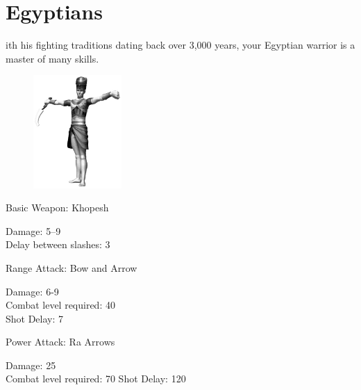 \clearpage

\section{Egyptians}


ith his fighting traditions dating back over 3,000 years, your Egyptian warrior is a master of many skills.

\begin{figure}
	\begin{center}
		\vspace{-20pt}
		\includegraphics[width=0.3\textwidth]{Aegyptian}
	\end{center}
	\vspace{-20pt}
\end{figure}

Basic Weapon: Khopesh
\begin{changemargin}{.5cm}{0cm}
	Damage: 5–9 \\
	Delay between slashes: 3
	\end{changemargin}
Range Attack: Bow and Arrow
\begin{changemargin}{.5cm}{0cm}
	Damage: 6-9 \\
	Combat level required: 40 \\
	Shot Delay: 7
\end{changemargin}
Power Attack: Ra Arrows
\begin{changemargin}{.5cm}{0cm}
	Damage: 25 \\
	Combat level required: 70
	Shot Delay: 120 \\
\end{changemargin}


